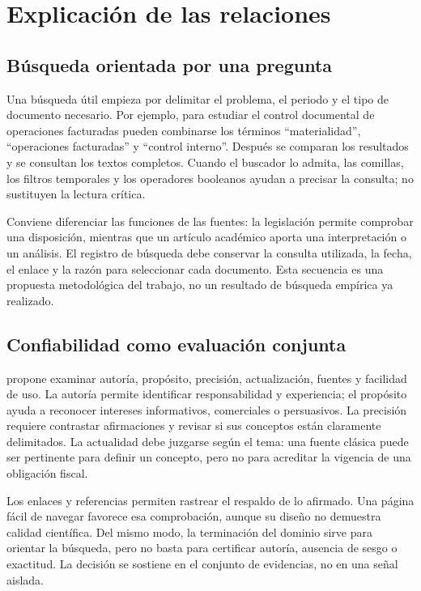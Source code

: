 \section{Explicación de las relaciones}
\subsection{Búsqueda orientada por una pregunta}
Una búsqueda útil empieza por delimitar el problema, el periodo y el tipo de documento necesario. Por ejemplo, para estudiar el control documental de operaciones facturadas pueden combinarse los términos \enquote{materialidad}, \enquote{operaciones facturadas} y \enquote{control interno}. Después se comparan los resultados y se consultan los textos completos. Cuando el buscador lo admita, las comillas, los filtros temporales y los operadores booleanos ayudan a precisar la consulta; no sustituyen la lectura crítica.

Conviene diferenciar las funciones de las fuentes: la legislación permite comprobar una disposición, mientras que un artículo académico aporta una interpretación o un análisis. El registro de búsqueda debe conservar la consulta utilizada, la fecha, el enlace y la razón para seleccionar cada documento. Esta secuencia es una propuesta metodológica del trabajo, no un resultado de búsqueda empírica ya realizado.

\subsection{Confiabilidad como evaluación conjunta}
\textcite{castillo2020} propone examinar autoría, propósito, precisión, actualización, fuentes y facilidad de uso. La autoría permite identificar responsabilidad y experiencia; el propósito ayuda a reconocer intereses informativos, comerciales o persuasivos. La precisión requiere contrastar afirmaciones y revisar si sus conceptos están claramente delimitados. La actualidad debe juzgarse según el tema: una fuente clásica puede ser pertinente para definir un concepto, pero no para acreditar la vigencia de una obligación fiscal.

Los enlaces y referencias permiten rastrear el respaldo de lo afirmado. Una página fácil de navegar favorece esa comprobación, aunque su diseño no demuestra calidad científica. Del mismo modo, la terminación del dominio sirve para orientar la búsqueda, pero no basta para certificar autoría, ausencia de sesgo o exactitud. La decisión se sostiene en el conjunto de evidencias, no en una señal aislada.

